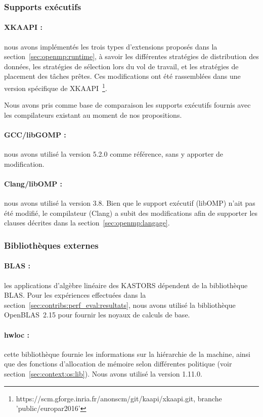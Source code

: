 \subsubsection{Supports exécutifs}


\paragraph{XKAAPI :} nous avons implémentés les trois types d'extensions proposés dans la section~\ref{sec:openmp:runtime}, à savoir les différentes stratégies de distribution des données, les stratégies de sélection lors du vol de travail, et les stratégies de placement des tâches prêtes.
Ces modifications ont été rassemblées dans une version spécifique de XKAAPI~\footnote{https://scm.gforge.inria.fr/anonscm/git/kaapi/xkaapi.git, branche 'public/europar2016'}.


Nous avons pris comme base de comparaison les supports exécutifs fournis avec les compilateurs existant au moment de nos propositions.

\paragraph{GCC/libGOMP :} nous avons utilisé la version 5.2.0 comme référence, sans y apporter de modification.

\paragraph{Clang/libOMP :} nous avons utilisé la version 3.8. Bien que le support exécutif (libOMP) n'ait pas été modifié, le compilateur (Clang) a subit des modifications afin de supporter les clauses décrites dans la section~\ref{sec:openmp:langage}.

\subsubsection{Bibliothèques externes}

\paragraph{BLAS :} les applications d'algèbre linéaire des KASTORS dépendent de la bibliothèque BLAS.
Pour les expériences effectuées dans la section~\ref{sec:contribs:perf_eval:resultats}, nous avons utilisé la bibliothèque OpenBLAS~2.15 pour fournir les noyaux de calculs de base.


\paragraph{hwloc :} cette bibliothèque fournie les informations sur la hiérarchie de la machine, ainsi que des fonctions d'allocation de mémoire selon différentes politique (voir section~\ref{sec:context:os:lib}). Nous avons utilisé la version 1.11.0.

